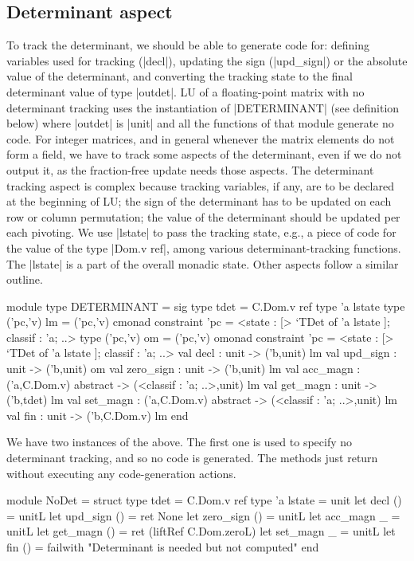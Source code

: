 \documentclass{elsart}
\begin{document}
\subsection{Determinant aspect}
\label{sec:det}
To track the determinant, we should be able to generate code
for: defining variables used for tracking (|decl|),
updating the sign (|upd_sign|) or the absolute
value of the determinant, and converting the tracking state
to the final determinant value of type |outdet|. LU of a
floating-point matrix with no determinant tracking uses the
instantiation of |DETERMINANT| (see definition below) where |outdet| is |unit|
and all the
functions of that module generate no code. For integer matrices, and
in general whenever the matrix elements do not form a field, we
have to track some aspects of the determinant, even if we do not output
it, as the fraction-free update needs those aspects. The determinant tracking
aspect is complex because tracking variables, if any, are to be declared at the
beginning of LU; the sign
of the determinant has to be updated on each row or column
permutation; the value of the determinant should be updated per each
pivoting. We use |lstate| to pass the tracking state, e.g., a piece of
code for the value of the type |Dom.v ref|, among
various determinant-tracking functions. The |lstate| is a part of the
overall monadic state. 
Other aspects follow a similar outline.

\begin{code}
module type DETERMINANT = sig
  type tdet = C.Dom.v ref
  type 'a lstate
  type ('pc,'v) lm = ('pc,'v) cmonad
    constraint 'pc = <state : [> `TDet of 'a lstate ]; classif : 'a; ..>
  type ('pc,'v) om = ('pc,'v) omonad
    constraint 'pc = <state : [> `TDet of 'a lstate ]; classif : 'a; ..>
  val decl      : unit -> ('b,unit) lm
  val upd_sign  : unit -> ('b,unit) om
  val zero_sign : unit -> ('b,unit) lm
  val acc_magn  : ('a,C.Dom.v) abstract -> (<classif : 'a; ..>,unit) lm
  val get_magn  : unit -> ('b,tdet) lm
  val set_magn  : ('a,C.Dom.v) abstract -> (<classif : 'a; ..>,unit) lm
  val fin       : unit -> ('b,C.Dom.v) lm
end
\end{code}

We have two instances of the above. The first one is used to specify
no determinant tracking, and so no code is
generated. The methods just return without executing any
code-generation actions.
\begin{code}
module NoDet =
  struct
  type tdet = C.Dom.v ref
  type 'a lstate = unit
  let decl () = unitL
  let upd_sign () = ret None
  let zero_sign () = unitL
  let acc_magn _ = unitL
  let get_magn () = ret (liftRef C.Dom.zeroL)
  let set_magn _ = unitL
  let fin () = failwith "Determinant is needed but not computed"
end
\end{code}
\end{document}
